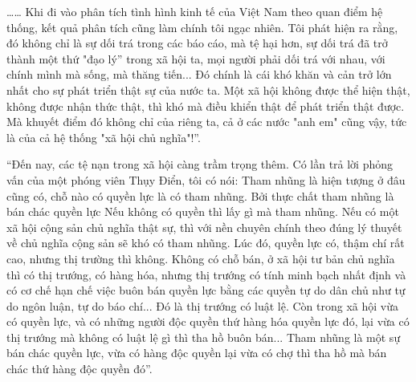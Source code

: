 …… Khi đi vào phân tích tình hình kinh tế của Việt Nam theo quan điểm hệ thống, kết quả phân tích cũng làm chính tôi ngạc nhiên. Tôi phát hiện ra rằng, đó không chỉ là sự dối trá trong các báo cáo, mà tệ hại hơn, sự dối trá đã trở thành một thứ "đạo lý” trong xã hội ta, mọi người phải dối trá với nhau, với chính mình mà sống, mà thăng tiến... Đó chính là cái khó khăn và cản trở lớn nhất cho sự phát triển thật sự của nước ta. Một xã hội không được thể hiện thật, không được nhận thức thật, thì khó mà điều khiển thật để phát triển thật được. Mà khuyết điểm đó không chỉ của riêng ta, cả ở các nước "anh em" cũng vậy, tức là của cả hệ thống "xã hội chủ nghĩa"!”. 

“Đến nay, các tệ nạn trong xã hội càng trầm trọng thêm. Có lần trả lời phỏng vấn của một phóng viên Thụy Điển, tôi có nói: Tham nhũng là hiện tượng ở đâu cũng có, chỗ nào có quyền lực là có tham nhũng. Bởi thực chất tham nhũng là bán chác quyền lực Nếu không có quyền thì lấy gì mà tham nhũng. Nếu có một xã hội cộng sản chủ nghĩa thật sự, thì với nền chuyên chính theo đúng lý thuyết về chủ nghĩa cộng sản sẽ khó có tham nhũng. Lúc đó, quyền lực có, thậm chí rất cao, nhưng thị trường thì không. Không có chỗ bán, ở xã hội tư bản chủ nghĩa thì có thị trướng, có hàng hóa, nhưng thị trướng có tính minh bạch nhất định và có cơ chế hạn chế việc buôn bán quyền lực bằng các quyền tự do dân chủ như tự do ngôn luận, tự do báo chí... Đó là thị trướng có luật lệ. Còn trong xã hội vừa có quyền lực, và có những người độc quyền thứ hàng hóa quyền lực đó, lại vừa có thị trướng mà không có luật lệ gì thì tha hồ buôn bán... Tham nhũng là một sự bán chác quyền lực, vừa có hàng độc quyền lại vừa có chợ thì tha hồ mà bán chác thứ hàng độc quyền đó”. 

